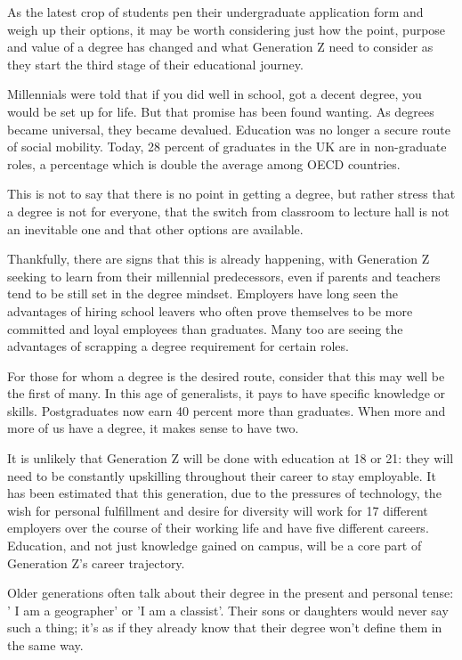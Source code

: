 As the latest crop of students pen their undergraduate application form and weigh up their options, it may be worth considering just how the point, purpose and value of a degree has changed and what Generation Z need to consider as they start the third stage of their educational journey.


Millennials were told that if you did well in school, got a decent degree, you would be set up for life. But that promise has been found wanting. As degrees became universal, they became devalued. Education was no longer a secure route of social mobility. Today, 28 percent of graduates in the UK are in non-graduate roles, a percentage which is double the average among OECD countries.


This is not to say that there is no point in getting a degree, but rather stress that a degree is not for everyone, that the switch from classroom to lecture hall is not an inevitable one and that other options are available.


Thankfully, there are signs that this is already happening, with Generation Z seeking to learn from their millennial predecessors, even if parents and teachers tend to be still set in the degree mindset. Employers have long seen the advantages of hiring school leavers who often prove themselves to be more committed and loyal employees than graduates. Many too are seeing the advantages of scrapping a degree requirement for certain roles.


For those for whom a degree is the desired route, consider that this may well be the first of many. In this age of generalists, it pays to have specific knowledge or skills. Postgraduates now earn 40 percent more than graduates. When more and more of us have a degree, it makes sense to have two.


It is unlikely that Generation Z will be done with education at 18 or 21: they will need to be constantly upskilling throughout their career to stay employable. It has been estimated that this generation, due to the pressures of technology, the wish for personal fulfillment and desire for diversity will work for 17 different employers over the course of their working life and have five different careers. Education, and not just knowledge gained on campus, will be a core part of Generation Z's career trajectory.


Older generations often talk about their degree in the present and personal tense: ' I am a geographer' or 'I am a classist'. Their sons or daughters would never say such a thing; it's as if they already know that their degree won't define them in the same way. 